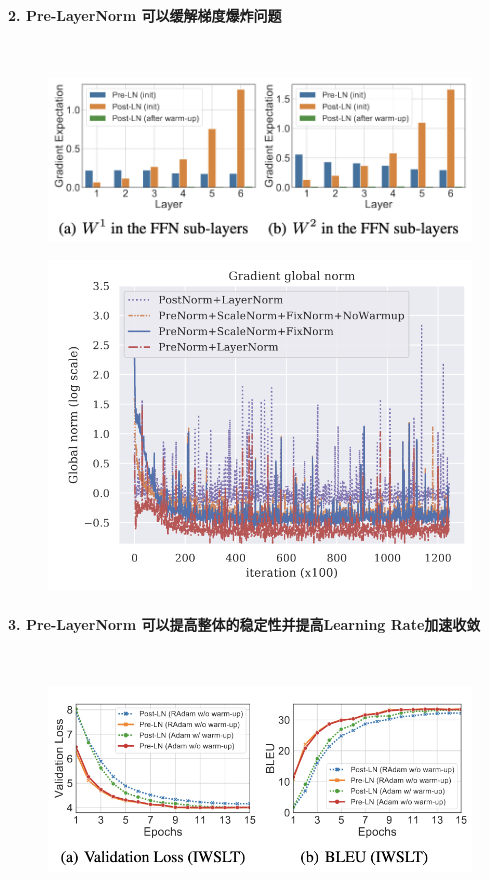 \clearpage
\paragraph{2. Pre-LayerNorm 可以缓解梯度爆炸问题}~{}
\\
\begin{figure}[htbp]
  \centering
  \includegraphics[width=0.65\linewidth]{figs/lec3/lec3.06.png}
\end{figure}


\begin{figure}[htbp]
  \centering
  \includegraphics[width=0.65\linewidth]{figs/lec3/lec3.08.png}
\end{figure}

\paragraph{3. Pre-LayerNorm 可以提高整体的稳定性并提高Learning Rate加速收敛}~{}
\begin{figure}[htbp]
  \centering
  \includegraphics[width=0.65\linewidth]{figs/lec3/lec3.09.png}
\end{figure}

